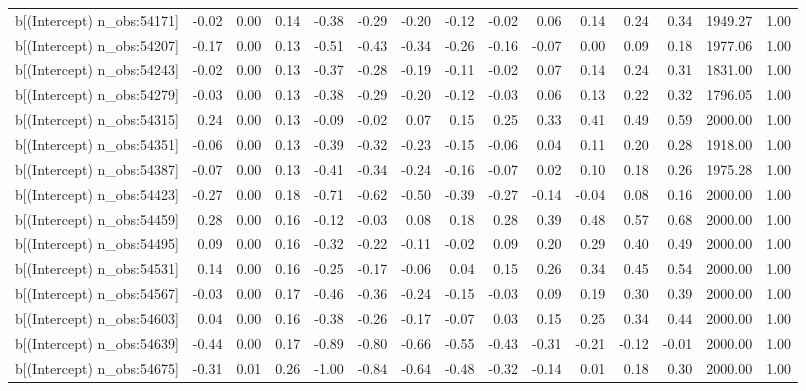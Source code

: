 \begin{table}[ht]
\begin{tabular}{rrrrrrrrrrrrrrr}
  b[(Intercept) n\_obs:54171] & -0.02 & 0.00 & 0.14 & -0.38 & -0.29 & -0.20 & -0.12 & -0.02 & 0.06 & 0.14 & 0.24 & 0.34 & 1949.27 & 1.00 \\ 
  b[(Intercept) n\_obs:54207] & -0.17 & 0.00 & 0.13 & -0.51 & -0.43 & -0.34 & -0.26 & -0.16 & -0.07 & 0.00 & 0.09 & 0.18 & 1977.06 & 1.00 \\ 
  b[(Intercept) n\_obs:54243] & -0.02 & 0.00 & 0.13 & -0.37 & -0.28 & -0.19 & -0.11 & -0.02 & 0.07 & 0.14 & 0.24 & 0.31 & 1831.00 & 1.00 \\ 
  b[(Intercept) n\_obs:54279] & -0.03 & 0.00 & 0.13 & -0.38 & -0.29 & -0.20 & -0.12 & -0.03 & 0.06 & 0.13 & 0.22 & 0.32 & 1796.05 & 1.00 \\ 
  b[(Intercept) n\_obs:54315] & 0.24 & 0.00 & 0.13 & -0.09 & -0.02 & 0.07 & 0.15 & 0.25 & 0.33 & 0.41 & 0.49 & 0.59 & 2000.00 & 1.00 \\ 
  b[(Intercept) n\_obs:54351] & -0.06 & 0.00 & 0.13 & -0.39 & -0.32 & -0.23 & -0.15 & -0.06 & 0.04 & 0.11 & 0.20 & 0.28 & 1918.00 & 1.00 \\ 
  b[(Intercept) n\_obs:54387] & -0.07 & 0.00 & 0.13 & -0.41 & -0.34 & -0.24 & -0.16 & -0.07 & 0.02 & 0.10 & 0.18 & 0.26 & 1975.28 & 1.00 \\ 
  b[(Intercept) n\_obs:54423] & -0.27 & 0.00 & 0.18 & -0.71 & -0.62 & -0.50 & -0.39 & -0.27 & -0.14 & -0.04 & 0.08 & 0.16 & 2000.00 & 1.00 \\ 
  b[(Intercept) n\_obs:54459] & 0.28 & 0.00 & 0.16 & -0.12 & -0.03 & 0.08 & 0.18 & 0.28 & 0.39 & 0.48 & 0.57 & 0.68 & 2000.00 & 1.00 \\ 
  b[(Intercept) n\_obs:54495] & 0.09 & 0.00 & 0.16 & -0.32 & -0.22 & -0.11 & -0.02 & 0.09 & 0.20 & 0.29 & 0.40 & 0.49 & 2000.00 & 1.00 \\ 
  b[(Intercept) n\_obs:54531] & 0.14 & 0.00 & 0.16 & -0.25 & -0.17 & -0.06 & 0.04 & 0.15 & 0.26 & 0.34 & 0.45 & 0.54 & 2000.00 & 1.00 \\ 
  b[(Intercept) n\_obs:54567] & -0.03 & 0.00 & 0.17 & -0.46 & -0.36 & -0.24 & -0.15 & -0.03 & 0.09 & 0.19 & 0.30 & 0.39 & 2000.00 & 1.00 \\ 
  b[(Intercept) n\_obs:54603] & 0.04 & 0.00 & 0.16 & -0.38 & -0.26 & -0.17 & -0.07 & 0.03 & 0.15 & 0.25 & 0.34 & 0.44 & 2000.00 & 1.00 \\ 
  b[(Intercept) n\_obs:54639] & -0.44 & 0.00 & 0.17 & -0.89 & -0.80 & -0.66 & -0.55 & -0.43 & -0.31 & -0.21 & -0.12 & -0.01 & 2000.00 & 1.00 \\ 
  b[(Intercept) n\_obs:54675] & -0.31 & 0.01 & 0.26 & -1.00 & -0.84 & -0.64 & -0.48 & -0.32 & -0.14 & 0.01 & 0.18 & 0.30 & 2000.00 & 1.00 \\ 

\end{tabular}
\end{table}
